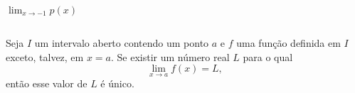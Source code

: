 \begin{frame}
\begin{columns}[onlytextwidth]
\begin{column}{0.49\textwidth}
\begin{enumerate}
        $\displaystyle\lim_{x\to -1}{p(x)}$
      \end{enumerate}
    \end{column}
    \begin{column}{0.48\textwidth}\vspace{-0.75cm}
      \begin{figure}
      \end{figure}
    \end{column}
  \end{columns}
\end{frame}

\begin{frame}
  \begin{theorem}
    Seja $I$ um intervalo aberto contendo um ponto $a$ e $f$ uma função definida em $I$ exceto, talvez, em $x=a$. Se existir um número real $L$ para o qual
    \begin{equation*}
      \lim_{x\to a}{f\left(x\right)}=L,
    \end{equation*}
    então esse valor de $L$ é único.
  \end{theorem}
\end{frame}

